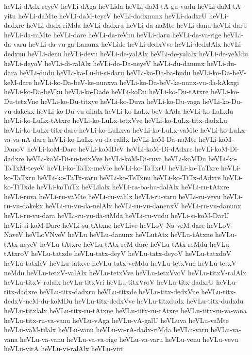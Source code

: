 {heVLi-dAdx-reyeV
heVLi-dAga
heVLida
heVLi-daM-tA-gu-vudu
heVLi-daM-tA-yitu
heVLi-daMte
heVLi-daM-teyeV
heVLi-dadxnunx
heVLi-dadxrU
heVLi-dadxre
heVLi-dadx-riMda
heVLi-dadxru
heVLi-da-naMte
heVLi-danu
heVLi-darU
heVLi-da-raMte
heVLi-dare
heVLi-da-reVnu
heVLi-daru
heVLi-da-va-rige
heVLi-da-varu
heVLi-da-vu-ga-Lanunx
heVLide
heVLi-dedxVve
heVLi-dedxlAlx
heVLi-dedxnu
heVLi-denu
heVLi-devu
heVLi-de-yalAlx
heVLi-de-yalalx
heVLi-de-yeMdu
heVLi-deyoV
heVLi-di-ralAlx
heVLi-do-Da-neyeV
heVLi-du-danunx
heVLi-du-dara
heVLi-dudu
heVLi-ka-Lu-hi-si-daru
heVLi-ko-Da-ba-hudu
heVLi-ko-Da-beV-keM-dare
heVLi-ko-Da-beV-ke-nunxva
heVLi-ko-Da-beV-ke-nunx-vu-da-kAkxgi
heVLi-ko-Da-beVku
heVLi-ko-Dade
heVLi-koDu
heVLi-ko-Du-tAtxre
heVLi-ko-Du-tetxVne
heVLi-ko-Du-titxye
heVLi-ko-Duva
heVLi-ko-Du-vaga
heVLi-ko-Du-vu-dakekx
heVLi-ko-Du-vu-dilalx
heVLi-ko-LaLx-beV-kAda
heVLi-ko-LaLxlu
heVLi-ko-LuLx-tAtxre
heVLi-ko-LuLx-tetxVve
heVLi-ko-LuLx-titx-dadxLu
heVLi-ko-LuLx-titx-dare
heVLi-ko-LuLxva
heVLi-ko-LuLx-vaMte
heVLi-ko-LuLx-va-va-nA-dare
heVLi-ko-LuLx-vu-da-ralilx
heVLi-koM-Da-naMte
heVLi-koM-DanoV
heVLi-koM-Dare
heVLi-koMDeV
heVLi-koM-Di-dAdxre
heVLi-koM-Di-dadxre
heVLi-koM-Di-ru-tetxVve
heVLi-koM-Di-ruva
heVLi-koMDu
heVLi-ko-TaTxM-teyeV
heVLi-ko-TaTx-meVle
heVLi-ko-TaTxrU
heVLi-ko-TaTxre
heVLi-ko-TaTxru
heVLi-ko-TaTx-varu
heVLi-ko-TeTxnu
heVLi-ko-TiTx-dAdxre
heVLi-ko-TiTxde
heVLi-koTuTx
heVLilalx
heVLi-ra-ba-hu-dalAlx
heVLi-ru-tAtxre
heVLi-ruva
heVLi-ru-vaMte
heVLi-ru-valilx
heVLi-ru-varu
heVLi-ru-vevu
heVLi-ru-vu-dakekx
heVLi-ru-vu-da-nelAlx
heVLi-ru-vu-danenxV
heVLi-ru-vu-danunx
heVLi-ru-vu-dara
heVLi-ru-vu-da-riMda
heVLi-ru-vudu
heVLi-si-koM-DarU
heVLi-si-koM-Dare
heVLi-su-tAtxne
heVLive
heVLoV-Na-veM-dare
heVLoV-NaveV
heVLoVNveV
heVLu
heVLu-danunx
heVLutAtx
heVLu-tAtxne
heVLu-tAtx-neyeV
heVLu-tAtxre
heVLu-tAtx-reM-dare
heVLu-tAtx-reMdu
heVLu-tAtxroV
heVLu-tatxde
heVLu-tatx-deyV
heVLu-tatx-deyoV
heVLu-tatxdoV
heVLu-tatxleV
heVLu-tatxve
heVLu-tatx-veMdu
heVLu-tetxVne
heVLu-tetxV-neMdu
heVLu-tetxV-valAlx
heVLu-tetxVve
heVLu-tetxVvoV
heVLu-titxV-ralAlx
heVLu-titxV-ralalx
heVLu-titxVri
heVLu-titxVroV
heVLu-titx-dadxrU
heVLu-titx-dadxre
heVLu-titx-dadxru
heVLu-titxde
heVLu-titx-dedxVne
heVLu-titx-dedxV-neM-du-koMDu
heVLu-titx-dedxVve
heVLu-titxdudx
heVLu-titx-dudxdu
heVLu-titxlalx
heVLu-titx-ru-tAtxne
heVLu-titx-ru-tAtxre
heVLu-titx-ru-va-vana
heVLu-titx-ru-va-vanu
heVLu-vAga
heVLu-vA-galU
heVLuva
heVLu-vaMte
heVLu-vaM-tilalx
heVLu-vanu
heVLu-va-rA-dadx-riMda
heVLu-varu
heVLu-va-vana
heVLu-va-vanu
heVLu-va-va-rige
heVLu-va-varu
heVLu-venu
heVLu-vevu
heVLu-virA
heVLu-vi-ralAlx
heVLu-viri
}
